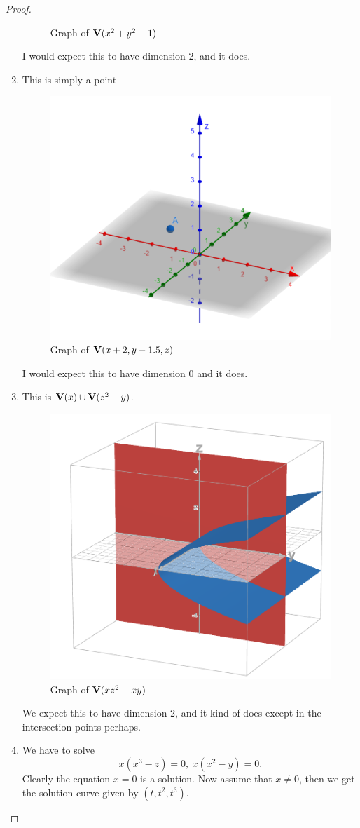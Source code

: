 \begin{proof}
\begin{enumerate}
\begin{figure}[H]
            \caption{Graph of $\mathbf{V}(x^2+y^2-1)$}
            \label{fig:sec1-2-ex4b}
        \end{figure}
        I would expect this to have dimension $2$, and it does.
        \item This is simply a point
        \begin{figure}[H]
            \centering
            \includegraphics[width=0.5\linewidth]{cox-little-oshea/assets/sec1-2-ex4c.png}
            \caption{Graph of $\mathbf{V}(x+2, y-1.5, z)$}
            \label{fig:sec1-2-ex4c}
        \end{figure}
        I would expect this to have dimension $0$ and it does.
        \item This is $\mathbf{V}(x)\cup \mathbf{V}(z^2 - y)$. 
        \begin{figure}[H]
            \centering
            \includegraphics[width=0.5\linewidth]{cox-little-oshea/assets/sec1-2-ex4d.png}
            \caption{Graph of $\mathbf{V}(xz^2 - xy)$}
            \label{fig:sec1-2-ex4d}
        \end{figure}
        We expect this to have dimension $2$, and it kind of does except in the intersection points perhaps.
        \item We have to solve
        $$x(x^3 - z) = 0,~x(x^2 - y) = 0.$$
        Clearly the equation $x=0$ is a solution. Now assume that $x\neq 0$, then we get the solution curve given by $(t,t^2,t^3)$.

\end{enumerate}
\end{proof}
